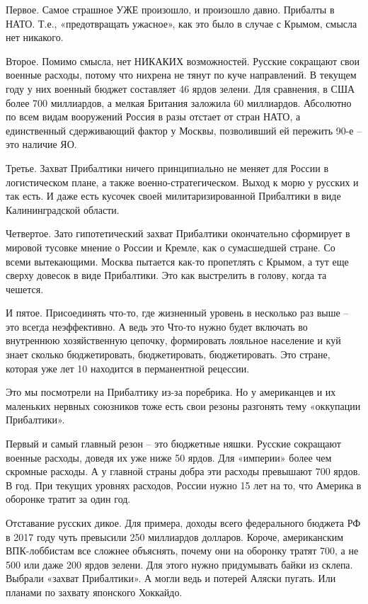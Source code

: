 Первое. Самое страшное УЖЕ произошло, и произошло давно. Прибалты в НАТО. Т.е.,
«предотвращать ужасное», как это было в случае с Крымом, смысла нет никакого.

Второе. Помимо смысла, нет НИКАКИХ возможностей. Русские сокращают свои военные
расходы, потому что нихрена не тянут по куче направлений. В текущем году у них
военный бюджет составляет 46 ярдов зелени. Для сравнения, в США более 700
миллиардов, а мелкая Британия заложила 60 миллиардов. Абсолютно по всем видам
вооружений Россия в разы отстает от стран НАТО, а единственный сдерживающий
фактор у Москвы, позволивший ей пережить 90-е – это наличие ЯО.

Третье. Захват Прибалтики ничего принципиально не меняет для России в
логистическом плане, а также военно-стратегическом. Выход к морю у русских и
так есть. И даже есть кусочек своей милитаризированной Прибалтики в виде
Калининградской области.

Четвертое. Зато гипотетический захват Прибалтики окончательно сформирует в
мировой тусовке мнение о России и Кремле, как о сумасшедшей стране. Со всеми
вытекающими. Москва пытается как-то пропетлять с Крымом, а тут еще сверху
довесок в виде Прибалтики. Это как выстрелить в голову, когда та чешется.

И пятое. Присоединять что-то, где жизненный уровень в несколько раз выше – это
всегда неэффективно. А ведь это Что-то нужно будет включать во внутреннюю
хозяйственную цепочку, формировать лояльное население и куй знает сколько
бюджетировать, бюджетировать, бюджетировать. Это стране, которая уже лет 10
находится в перманентной рецессии.

Это мы посмотрели на Прибалтику из-за поребрика. Но у американцев и их
маленьких нервных союзников тоже есть свои резоны разгонять тему «оккупации
Прибалтики».

Первый и самый главный резон – это бюджетные няшки. Русские сокращают военные
расходы, доведя их уже ниже 50 ярдов. Для «империи» более чем скромные расходы.
А у главной страны добра эти расходы превышают 700 ярдов. В год. При текущих
уровнях расходов, России нужно 15 лет на то, что Америка в оборонке тратит за
один год.

Отставание русских дикое. Для примера, доходы всего федерального бюджета РФ в
2017 году чуть превысили 250 миллиардов долларов. Короче, американским
ВПК-лоббистам все сложнее объяснять, почему они на оборонку тратят 700, а не
500 или даже 200 ярдов зелени. Для этого нужно придумывать байки из склепа.
Выбрали «захват Прибалтики». А могли ведь и потерей Аляски пугать. Или планами
по захвату японского Хоккайдо.

